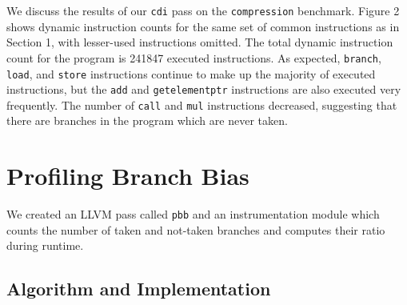 \documentclass[12pt]{article}
\begin{document}
We discuss the results of our {\tt cdi} pass on the {\tt compression} benchmark. Figure 2 shows dynamic instruction counts for the same set of common instructions as in Section 1, with lesser-used instructions omitted. The total dynamic instruction count for the program is 241847 executed instructions. As expected, {\tt branch}, {\tt load}, and {\tt store} instructions continue to make up the majority of executed instructions, but the {\tt add} and {\tt getelementptr} instructions are also executed very frequently. The number of {\tt call} and {\tt mul} instructions decreased, suggesting that there are branches in the program which are never taken. 

\section{Profiling Branch Bias}

We created an LLVM pass called {\tt pbb} and an instrumentation module which counts the number of taken and not-taken branches and computes their ratio during runtime.

\subsection{Algorithm and Implementation}
\end{document}
